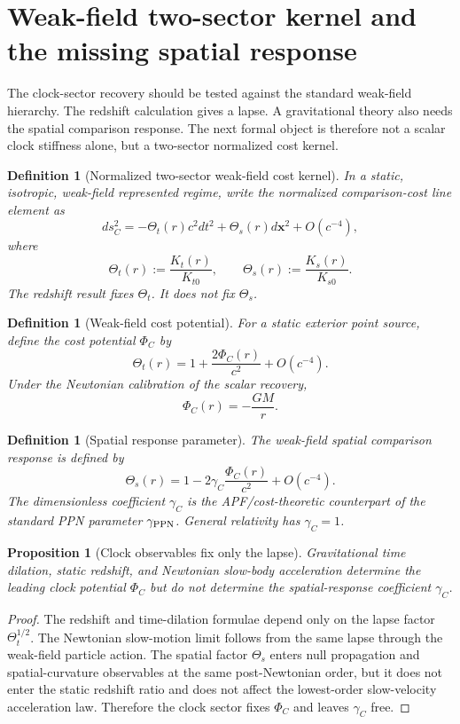 \documentclass[11pt]{article}
\newtheorem{proposition}[theorem]{Proposition}
\newtheorem{definition}[theorem]{Definition}
\theoremstyle{remark}
\begin{document}
\section{Weak-field two-sector kernel and the missing spatial response}

The clock-sector recovery should be tested against the standard weak-field hierarchy.  The redshift calculation gives a lapse.  A gravitational theory also needs the spatial comparison response.  The next formal object is therefore not a scalar clock stiffness alone, but a two-sector normalized cost kernel.

\begin{definition}[Normalized two-sector weak-field cost kernel]
\label{def:two-sector-kernel}
In a static, isotropic, weak-field represented regime, write the normalized comparison-cost line element as
\[
        ds_C^2
        =-\Theta_t(r)c^2dt^2+\Theta_s(r)d\mathbf x^2+O(c^{-4}),
\]
where
\[
        \Theta_t(r):=\frac{K_t(r)}{K_{t0}},
        \qquad
        \Theta_s(r):=\frac{K_s(r)}{K_{s0}}.
\]
The redshift result fixes \(\Theta_t\).  It does not fix \(\Theta_s\).
\end{definition}

\begin{definition}[Weak-field cost potential]
For a static exterior point source, define the cost potential \(\Phi_C\) by
\[
        \Theta_t(r)=1+\frac{2\Phi_C(r)}{c^2}+O(c^{-4}).
\]
Under the Newtonian calibration of the scalar recovery,
\[
        \Phi_C(r)=-\frac{GM}{r}.
\]
\end{definition}

\begin{definition}[Spatial response parameter]
The weak-field spatial comparison response is defined by
\[
        \Theta_s(r)=1-2\gamma_C\frac{\Phi_C(r)}{c^2}+O(c^{-4}).
\]
The dimensionless coefficient \(\gamma_C\) is the APF/cost-theoretic counterpart of the standard PPN parameter \(\gamma_{\rm PPN}\).  General relativity has \(\gamma_C=1\).
\end{definition}

\begin{proposition}[Clock observables fix only the lapse]
\label{prop:clock-only-lapse}
Gravitational time dilation, static redshift, and Newtonian slow-body acceleration determine the leading clock potential \(\Phi_C\) but do not determine the spatial-response coefficient \(\gamma_C\).
\end{proposition}

\begin{proof}
The redshift and time-dilation formulae depend only on the lapse factor \(\Theta_t^{1/2}\).  The Newtonian slow-motion limit follows from the same lapse through the weak-field particle action.  The spatial factor \(\Theta_s\) enters null propagation and spatial-curvature observables at the same post-Newtonian order, but it does not enter the static redshift ratio and does not affect the lowest-order slow-velocity acceleration law.  Therefore the clock sector fixes \(\Phi_C\) and leaves \(\gamma_C\) free.
\end{proof}
\end{document}
